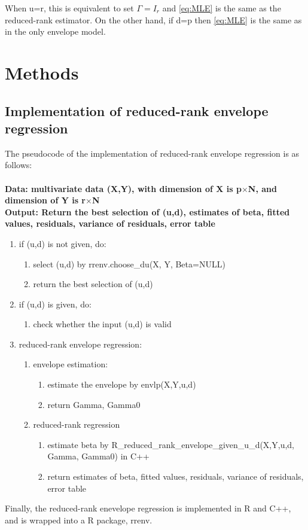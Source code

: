 \documentclass[11pt,a4paper]{article}
\begin{document}
When u=r, this is equivalent to set $\Gamma=I_r$ and \ref{eq:MLE} is the same as the reduced-rank estimator. On the other hand, if d=p then \ref{eq:MLE} is the same as in the only envelope model.
\section{Methods}
\subsection{Implementation of reduced-rank envelope regression}
The pseudocode of the implementation of reduced-rank envelope regression is as follows:\\
\vspace{0.1cm}\\
\textbf{Data: multivariate data (X,Y), with dimension of X is p$\times$N, and dimension of Y is r$\times$N}\\
\textbf{Output: Return the best selection of (u,d), estimates of beta, fitted values, residuals, variance of residuals, error table}
\begin{enumerate}
\item if (u,d) is not given, do:
\begin{enumerate}
\item select (u,d) by rrenv.choose\_du(X, Y, Beta=NULL)
\item return the best selection of (u,d)
\end{enumerate}
\item if (u,d) is given, do:
\begin{enumerate}
\item check whether the input (u,d) is valid
\end{enumerate}
\item reduced-rank envelope regression:
\begin{enumerate}
\item envelope estimation:
\begin{enumerate}
\item estimate the envelope by envlp(X,Y,u,d)
\item return Gamma, Gamma0
\end{enumerate}
\item reduced-rank regression
\begin{enumerate}
\item estimate beta by R\_reduced\_rank\_envelope\_given\_u\_d(X,Y,u,d, Gamma, Gamma0) in C++
\item return estimates of beta, fitted values, residuals, variance of residuals, error table
\end{enumerate}
\end{enumerate}
\end{enumerate}
Finally, the reduced-rank enevelope regression is implemented in R and C++, and is wrapped into a R package, rrenv.
\end{document}

